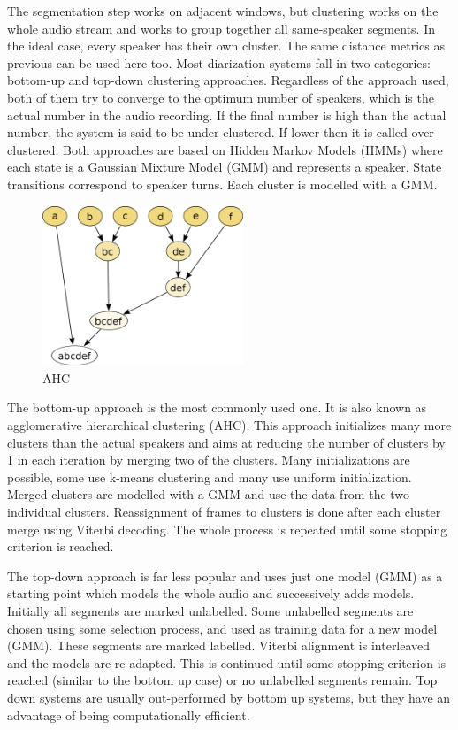 	The segmentation step works on adjacent windows, but clustering works on the whole audio stream and works to group together all same-speaker segments. In the ideal case, every speaker has their own cluster. The same distance metrics as previous can be used here too. Most diarization systems fall in two categories: bottom-up and top-down clustering approaches. Regardless of the approach used, both of them try to converge to the optimum number of speakers, which is the actual number in the audio recording. If the final number is high than the actual number, the system is said to be under-clustered. If lower then it is called over-clustered. Both approaches are based on Hidden Markov Models (HMMs) where each state is a Gaussian Mixture Model (GMM) and represents a speaker. State transitions correspond to speaker turns. Each cluster is modelled with a GMM.
	
\begin{figure}[h]
\includegraphics[width=6cm]{figures/hac-2.png}
\centering
\caption{AHC \cite{wiki:hac}}
\label{fig:hac2}
\end{figure}
	
	The bottom-up approach is the most commonly used one. It is also known as agglomerative hierarchical clustering (AHC). This approach initializes many more clusters than the actual speakers and aims at reducing the number of clusters by 1 in each iteration by merging two of the clusters. Many initializations are possible, some use k-means clustering and many use uniform initialization. Merged clusters are modelled with a GMM and use the data from the two individual clusters. Reassignment of frames to clusters is done after each cluster merge using Viterbi decoding. The whole process is repeated until some stopping criterion is reached.
		
	The top-down approach is far less popular and uses just one model (GMM) as a starting point which models the whole audio and successively adds models. Initially all segments are marked unlabelled.  Some unlabelled segments are chosen using some selection process, and used as training data for a new model (GMM). These segments are marked labelled. Viterbi alignment is interleaved and the models are re-adapted. This is continued until some stopping criterion is reached (similar to the bottom up case) or no unlabelled segments remain. Top down systems are usually out-performed by bottom up systems, but they have an advantage of being computationally efficient.
	

